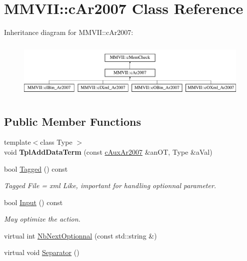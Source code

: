 \hypertarget{classMMVII_1_1cAr2007}{}\section{M\+M\+V\+II\+:\+:c\+Ar2007 Class Reference}
\label{classMMVII_1_1cAr2007}
Inheritance diagram for M\+M\+V\+II\+:\+:c\+Ar2007\+:\begin{figure}[H]
\begin{center}
\leavevmode
\includegraphics[height=2.800000cm]{classMMVII_1_1cAr2007}
\end{center}
\end{figure}
\subsection*{Public Member Functions}
\begin{DoxyCompactItemize}
\item 
{\footnotesize template$<$class Type $>$ }\\void {\bfseries Tpl\+Add\+Data\+Term} (const \hyperlink{classMMVII_1_1cAuxAr2007}{c\+Aux\+Ar2007} \&an\+OT, Type \&a\+Val)\hypertarget{classMMVII_1_1cAr2007_ac0d9b7e5fe4a52e156cb381afc1b5489}{}\label{classMMVII_1_1cAr2007_ac0d9b7e5fe4a52e156cb381afc1b5489}

\item 
bool \hyperlink{classMMVII_1_1cAr2007_a3fc817e18aa0bea2e3dc140dd8d02ca4}{Tagged} () const \hypertarget{classMMVII_1_1cAr2007_a3fc817e18aa0bea2e3dc140dd8d02ca4}{}\label{classMMVII_1_1cAr2007_a3fc817e18aa0bea2e3dc140dd8d02ca4}

\begin{DoxyCompactList}\small\item\em Tagged File = xml Like, important for handling optionnal parameter. \end{DoxyCompactList}\item 
bool \hyperlink{classMMVII_1_1cAr2007_ad09d93f511744e5b6ea1c809b6e35b55}{Input} () const \hypertarget{classMMVII_1_1cAr2007_ad09d93f511744e5b6ea1c809b6e35b55}{}\label{classMMVII_1_1cAr2007_ad09d93f511744e5b6ea1c809b6e35b55}

\begin{DoxyCompactList}\small\item\em May optimize the action. \end{DoxyCompactList}\item 
virtual int \hyperlink{classMMVII_1_1cAr2007_a749540f7486016c2d48c4b48999a5135}{Nb\+Next\+Optionnal} (const std\+::string \&)
\item 
virtual void \hyperlink{classMMVII_1_1cAr2007_af01ec44f669821eaca45585f0c66541a}{Separator} ()
\end{DoxyCompactItemize}
